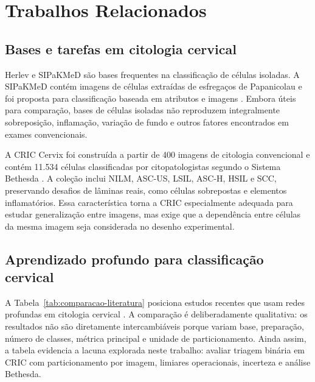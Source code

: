 \section{Trabalhos Relacionados}

\subsection{Bases e tarefas em citologia cervical}

Herlev e SIPaKMeD são bases frequentes na classificação de células isoladas. A
SIPaKMeD contém imagens de células extraídas de esfregaços de Papanicolau e foi
proposta para classificação baseada em atributos e imagens
\cite{plissiti2018sipakmed}. Embora úteis para comparação, bases de células
isoladas não reproduzem integralmente sobreposição, inflamação, variação de
fundo e outros fatores encontrados em exames convencionais.

A CRIC Cervix foi construída a partir de 400 imagens de citologia convencional
e contém 11.534 células classificadas por citopatologistas segundo o Sistema
Bethesda \cite{rezende2021cric}. A coleção inclui NILM, ASC-US, LSIL, ASC-H,
HSIL e SCC, preservando desafios de lâminas reais, como células sobrepostas e
elementos inflamatórios. Essa característica torna a CRIC especialmente
adequada para estudar generalização entre imagens, mas exige que a dependência
entre células da mesma imagem seja considerada no desenho experimental.

\subsection{Aprendizado profundo para classificação cervical}

A Tabela~\ref{tab:comparacao-literatura} posiciona estudos recentes que usam
redes profundas em citologia cervical
\cite{kaur2025comparison,mehedi2024lightweight,lima2025ensemble,rodriguez2024automated}.
A comparação é deliberadamente qualitativa: os resultados não são diretamente
intercambiáveis porque variam base, preparação, número de classes, métrica
principal e unidade de particionamento. Ainda assim, a tabela evidencia a
lacuna explorada neste trabalho: avaliar triagem binária em CRIC com
particionamento por imagem, limiares operacionais, incerteza e análise
Bethesda.

